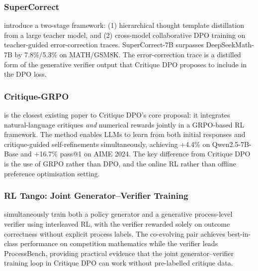 \subsubsection{SuperCorrect}

\autocite{yang2024supercorrect} introduce a two-stage framework: (1)
hierarchical thought template distillation from a large teacher model,
and (2) cross-model collaborative DPO training on teacher-guided
error-correction traces.  SuperCorrect-7B surpasses DeepSeekMath-7B
by 7.8\%/5.3\% on MATH/GSM8K.  The error-correction trace is a
distilled form of the generative verifier output that Critique DPO
proposes to include in the DPO loss.



\subsubsection{Critique-GRPO}

\autocite{zhang2025critiquegrpoadvancingllm} is the closest
existing paper to Critique DPO's core proposal: it integrates
natural-language critiques \emph{and} numerical rewards jointly in a
GRPO-based RL framework.  The method enables LLMs to learn from both
initial responses and critique-guided self-refinements simultaneously,
achieving +4.4\% on Qwen2.5-7B-Base and +16.7\% pass@1 on AIME 2024.
The key difference from Critique DPO is the use of GRPO rather than
DPO, and the online RL rather than offline preference optimisation
setting.

\subsubsection{RL Tango: Joint Generator--Verifier Training}

\autocite{zha2025rltangoreinforcinggenerator} simultaneously train
both a policy generator and a generative process-level verifier using
interleaved RL, with the verifier rewarded solely on outcome
correctness without explicit process labels.  The co-evolving pair
achieves best-in-class performance on competition mathematics while
the verifier leads ProcessBench, providing practical evidence that the
joint generator--verifier training loop in Critique DPO can work
without pre-labelled critique data.

